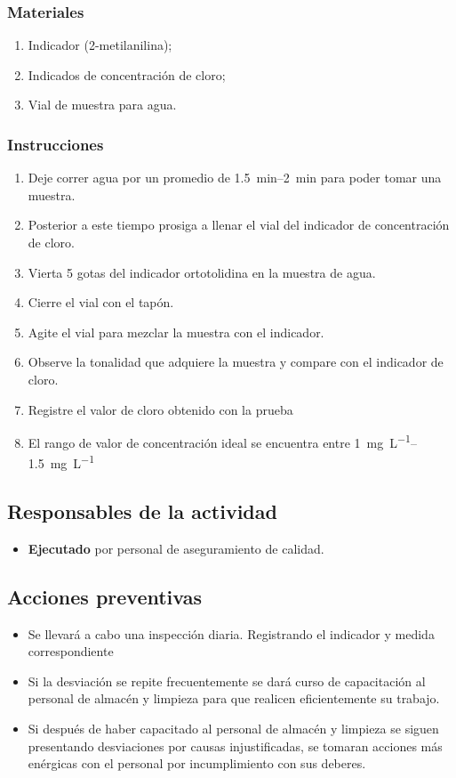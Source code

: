 \subsubsection{Materiales}
\begin{enumerate}
	\item Indicador (2-metilanilina);
	\item Indicados de concentración de cloro;
	\item Vial de muestra para agua.
\end{enumerate}

\subsubsection{Instrucciones}

\begin{enumerate}
	\item Deje correr agua por un promedio de \qtyrange{1.5}{2}{\minute} para poder tomar una muestra.
	\item Posterior a este tiempo prosiga a llenar el vial del indicador de concentración de cloro.
	\item Vierta 5 gotas del indicador ortotolidina en la muestra de agua.
	\item Cierre el vial con el tapón.
	\item Agite el vial para mezclar la muestra con el indicador.
	\item Observe la tonalidad que adquiere la muestra y compare con el indicador de cloro.
	\item Registre el valor de cloro obtenido con la prueba
	\item El rango de valor de concentración ideal se encuentra entre \qtyrange{1}{1.5}{\milli\gram\per\liter}
\end{enumerate}

\subsection{Responsables de la actividad}
\begin{itemize}
	\item \textbf{Ejecutado} por personal de aseguramiento de calidad.
\end{itemize}

\subsection{Acciones preventivas}
\begin{itemize}
	\item Se llevará a cabo una inspección diaria. Registrando el indicador y medida correspondiente
	\item Si la desviación se repite frecuentemente se dará curso de capacitación al personal de almacén y limpieza para que realicen eficientemente su trabajo.
	\item Si después de haber capacitado al personal de almacén y limpieza se siguen presentando desviaciones por causas injustificadas, se tomaran acciones más enérgicas con el personal por incumplimiento con sus deberes.
\end{itemize}


